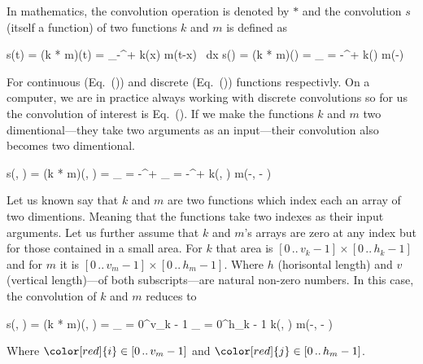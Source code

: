\startsubsubsection[title=Where is the convolution?]
In mathematics, the convolution operation is denoted by $*$ and the convolution $s$ (itself a function) of two functions $k$ and $m$ is defined as

\startplaceformula[reference=cont-conv]
\startformula
s(t) = (k * m)(t) = \int_{{-}\infty}^{{+}\infty} k(x) \cdot m(t-x) \, {\rm d}x
\stopformula
\stopplaceformula
\startplaceformula[reference=disc-conv]
\startformula
s(\color[red]{i}) = (k * m)(\color[red]{i}) = \sum_{\color[blue]{i} = {-}\infty}^{{+}\infty} k(\color[blue]{i}) \cdot m(\color[red]{i}-\color[blue]{i})
\stopformula
\stopplaceformula

For continuous (Eq.~()) and discrete (Eq.~()) functions respectivly.
On a computer, we are in practice always working with discrete convolutions so for us the convolution of interest is Eq.~().
If we make the functions $k$ and $m$ two dimentional---they take two arguments as an input---their convolution also becomes two dimentional.

\startplaceformula[reference=twodim-disc-conv]
\startformula
s(\color[red]{i}, \color[red]{j}) = (k * m)(\color[red]{i}, \color[red]{j}) = \sum_{\color[blue]{i} = {-}\infty}^{{+}\infty} \sum_{\color[blue]{j} = {-}\infty}^{{+}\infty} k(\color[blue]{i}, \color[blue]{j}) \cdot m(\color[red]{i}-\color[blue]{i}, \color[red]{j} - \color[blue]{j})
\stopformula
\stopplaceformula

\indentation
Let us known say that $k$ and $m$ are two functions which index each an array of two dimentions.
Meaning that the functions take two indexes as their input arguments.
Let us further assume that $k$ and $m$'s arrays are zero at any index but for those contained in a small area.
For $k$ that area is $[0 \, .. \, v_k - 1] \times [0 \, .. \, h_k - 1]$ and for $m$ it is $[0 \, .. \, v_m - 1] \times [0 \, .. \, h_m - 1]$.
Where $h$ (horisontal length) and $v$ (vertical length)---of both subscripts---are natural non-zero numbers.
In this case, the convolution of $k$ and $m$ reduces to

\startplaceformula[reference=twodim-disc-conv-finite]
\startformula
s(\color[red]{i}, \color[red]{j}) = (k * m)(\color[red]{i}, \color[red]{j}) = \sum_{\color[blue]{i} = 0}^{v_k - 1} \sum_{\color[blue]{j} = 0}^{h_k - 1} k(\color[blue]{i}, \color[blue]{j}) \cdot m(\color[red]{i}-\color[blue]{i}, \color[red]{j} - \color[blue]{j})
\stopformula
\stopplaceformula

Where $\color[red]{i} \in [0 \, .. \, v_m - 1]$ and $\color[red]{j} \in [0 \, .. \, h_m - 1]$.

